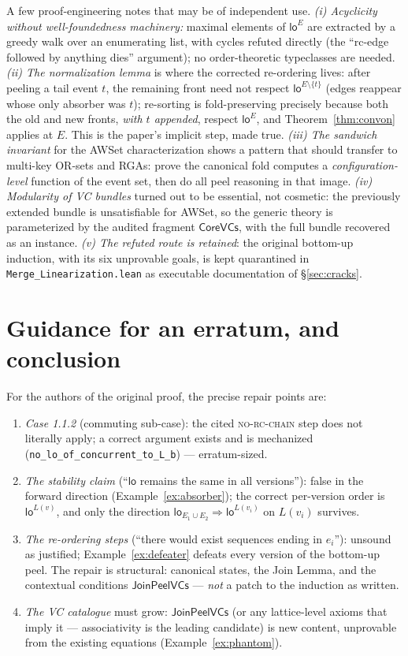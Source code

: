 \documentclass[11pt]{article}
\newcommand{\loE}[1]{\mathsf{lo}^{#1}}
\newcommand{\co}{\mathsf{CoreVCs}}
\newcommand{\jp}{\mathsf{JoinPeelVCs}}
\newcommand{\lean}[1]{\texttt{#1}}
\begin{document}
A few proof-engineering notes that may be of independent use.
\emph{(i) Acyclicity without well-foundedness machinery:} maximal
elements of $\loE{E}$ are extracted by a greedy walk over an enumerating
list, with cycles refuted directly (the ``rc-edge followed by anything
dies'' argument); no order-theoretic typeclasses are needed.
\emph{(ii) The normalization lemma} is where the corrected re-ordering
lives: after peeling a tail event $t$, the remaining front need not
respect $\loE{E \setminus \{t\}}$ (edges reappear whose only absorber was
$t$); re-sorting is fold-preserving precisely because both the old and
new fronts, \emph{with $t$ appended}, respect $\loE{E}$, and
Theorem~\ref{thm:convon} applies at $E$. This is the paper's implicit
step, made true. \emph{(iii) The sandwich invariant} for the
\textsf{AWSet} characterization shows a pattern that should transfer to
multi-key OR-sets and RGAs: prove the canonical fold computes a
\emph{configuration-level} function of the event set, then do all peel
reasoning in that image. \emph{(iv) Modularity of VC bundles} turned out
to be essential, not cosmetic: the previously extended bundle is
unsatisfiable for \textsf{AWSet}, so the generic theory is parameterized
by the audited fragment $\co$, with the full bundle recovered as an
instance. \emph{(v) The refuted route is retained}: the original
bottom-up induction, with its six unprovable goals, is kept quarantined
in \lean{Merge\_Linearization.lean} as executable documentation of
\S\ref{sec:cracks}.

\section{Guidance for an erratum, and conclusion}

For the authors of the original proof, the precise repair points are:
\begin{enumerate}[leftmargin=2em]
\item \emph{Case 1.1.2} (commuting sub-case): the cited
\textsc{no-rc-chain} step does not literally apply; a correct argument
exists and is mechanized (\lean{no\_lo\_of\_concurrent\_to\_L\_b}) ---
erratum-sized.
\item \emph{The stability claim} (``$\mathsf{lo}$ remains the same in all
versions''): false in the forward direction
(Example~\ref{ex:absorber}); the correct per-version order is
$\loE{L(v)}$, and only the direction
$\mathsf{lo}_{E_1\cup E_2} \Rightarrow \loE{L(v_i)}$ on $L(v_i)$ survives.
\item \emph{The re-ordering steps} (``there would exist sequences ending
in $e_i$''): unsound as justified; Example~\ref{ex:defeater} defeats
every version of the bottom-up peel. The repair is structural: canonical
states, the Join Lemma, and the contextual conditions $\jp$ ---
\emph{not} a patch to the induction as written.
\item \emph{The VC catalogue} must grow: $\jp$ (or any lattice-level
axioms that imply it --- associativity is the leading candidate) is new
content, unprovable from the existing equations
(Example~\ref{ex:phantom}).
\end{enumerate}
\end{document}
